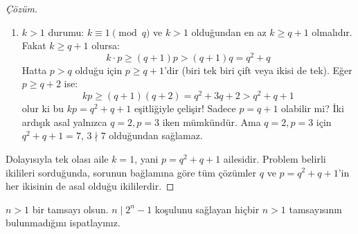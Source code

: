\begin{proof}[Çözüm]
\begin{enumerate}
    \item $k > 1$ durumu:
    $k \equiv 1 \pmod q$ ve $k > 1$ olduğundan en az $k \ge q + 1$ olmalıdır.
    Fakat $k \ge q + 1$ olursa:
    \[
    k \cdot p \ge (q + 1)p > (q + 1)q = q^2 + q
    \]
    Hatta $p > q$ olduğu için $p \ge q + 1$'dir (biri tek biri çift veya ikisi de tek).
    Eğer $p \ge q + 2$ ise:
    \[
    kp \ge (q + 1)(q + 2) = q^2 + 3q + 2 > q^2 + q + 1
    \]
    olur ki bu $kp = q^2 + q + 1$ eşitliğiyle çelişir!
    Sadece $p = q + 1$ olabilir mi? İki ardışık asal yalnızca $q=2, p=3$ iken mümkündür. Ama $q=2, p=3$ için $q^2+q+1 = 7$, $3 \nmid 7$ olduğundan sağlamaz.
\end{enumerate}
Dolayısıyla tek olası aile $k = 1$, yani $p = q^2 + q + 1$ ailesidir. Problem belirli ikilileri sorduğunda, sorunun bağlamına göre tüm çözümler $q$ ve $p = q^2 + q + 1$'in her ikisinin de asal olduğu ikililerdir.
\end{proof}

\begin{example}
$n > 1$ bir tamsayı olsun. $n \mid 2^n - 1$ koşulunu sağlayan hiçbir $n > 1$ tamsayısının bulunmadığını ispatlayınız.
\end{example}

